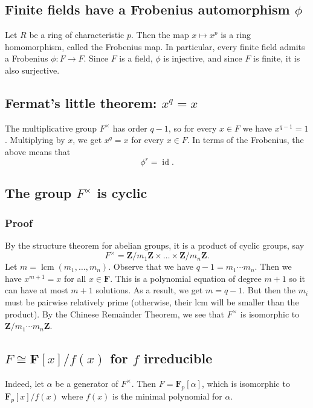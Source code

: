 \documentclass[11pt]{article}
\begin{document}
\subsection{Finite fields have a Frobenius automorphism \(\phi\)}
\label{sec:orgdab540a}
Let \(R\) be a ring of characteristic \(p\).
Then the map \(x \mapsto x^p\) is a ring homomorphism, called the Frobenius map.
In particular, every finite field admits a Frobenius \(\phi \colon F \to F\).
Since \(F\) is a field, \(\phi\) is injective, and since \(F\) is finite, it is also surjective.
\subsection{Fermat's little theorem: \(x^q = x\)}
\label{sec:org130e12a}
The multiplicative group \(F^{\times}\) has order \(q-1\), so for every \(x \in F\) we have \(x^{q-1} = 1\).
Multiplying by \(x\), we get \(x^q = x\) for every \(x \in F\).
In terms of the Frobenius, the above means that 
\[ \phi^r = \operatorname{id}.\]
\subsection{The group \(F^{\times}\) is cyclic}
\label{sec:org1e3c98f}
\subsubsection{Proof}
\label{sec:org8ace168}
By the structure theorem for abelian groups, it is a product of cyclic groups, say
\[ F^{\times} = \mathbf{Z}/m_1 \mathbf{Z} \times \dots \times \mathbf{Z}/ m_n \mathbf{Z}.\]
Let \(m = \operatorname{lcm}(m_1, \dots, m_n)\).
Observe that we have \(q - 1 = m_1 \cdots m_{n}.\)
Then we have \(x^{m+1} = x\) for all \(x \in \mathbf{F}\).
This is a polynomial equation of degree \(m+1\) so it can have at most \(m+1\) solutions.
As a result, we get \(m = q-1\).
But then the \(m_i\) must be pairwise relatively prime (otherwise, their lcm will be smaller than the product).
By the Chinese Remainder Theorem, we see that \(F^{\times}\) is isomorphic to \(\mathbf{Z} / m_1\cdots m_n \mathbf{Z}\).
\subsection{\(F \cong \mathbf{F}[x]/f(x)\) for \(f\) irreducible}
\label{sec:orgf21de4c}
Indeed, let \(\alpha\) be a generator of \(F^{\times}\).
Then \(F = \mathbf{F}_p[\alpha]\), which is isomorphic to \(\mathbf{F}_p[x]/f(x)\) where \(f(x)\) is the minimal polynomial for \(\alpha\).
\end{document}
